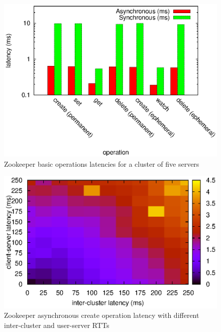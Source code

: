 \begin{figure}[h]
\centering
\includegraphics[scale=0.75]{img/ops_latencies_logscale.eps}
\caption{Zookeeper basic operations latencies for a cluster of five servers}
\label{fig:ops_latencies}
\end{figure}

\begin{figure}[h]
\centering
\includegraphics[scale=0.75]{img/async_ops_latencies_heatmap.eps}
\caption{Zookeeper asynchronous create operation latency with different inter-cluster and user-server RTTs}
\label{fig:async_heatmap}
\end{figure}

